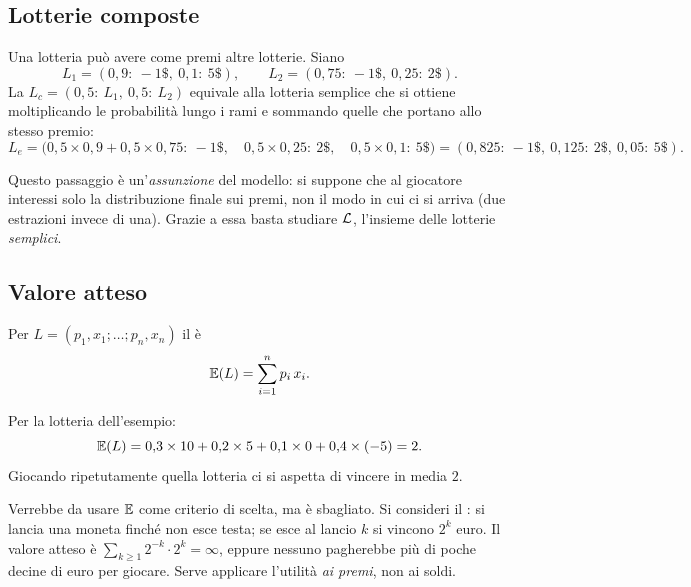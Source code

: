 \subsection{Lotterie composte}

Una lotteria può avere come premi altre lotterie. Siano
\[
  L_1 = (0{,}9{:}\ -1\$,\ 0{,}1{:}\ 5\$), \qquad
  L_2 = (0{,}75{:}\ -1\$,\ 0{,}25{:}\ 2\$).
\]
La  $L_c = (0{,}5{:}\ L_1,\ 0{,}5{:}\ L_2)$ equivale alla lotteria
semplice che si ottiene moltiplicando le probabilità lungo i rami e sommando quelle
che portano allo stesso premio:
\[
  L_e = \bigl(0{,}5 \times 0{,}9 + 0{,}5 \times 0{,}75 {:}\ -1\$,\quad
              0{,}5 \times 0{,}25 {:}\ 2\$,\quad
              0{,}5 \times 0{,}1 {:}\ 5\$\bigr)
      = (0{,}825{:}\ -1\$,\ 0{,}125{:}\ 2\$,\ 0{,}05{:}\ 5\$).
\]

\begin{osservazione}
Questo passaggio è un'\emph{assunzione} del modello: si suppone che al giocatore
interessi solo la distribuzione finale sui premi, non il modo in cui ci si arriva
(due estrazioni invece di una). Grazie a essa basta studiare $\mathcal{L}$, l'insieme delle
lotterie \emph{semplici}.
\end{osservazione}

\subsection{Valore atteso}

\begin{definizione}
Per $L = (p_1,x_1;\dots;p_n,x_n)$ il  è
\[
  \mathbb{E}(L) = \sum_{i=1}^{n} p_i\, x_i .
\]
\end{definizione}

Per la lotteria dell'esempio:
\[
  \mathbb{E}(L) = 0{,}3 \times 10 + 0{,}2 \times 5 + 0{,}1 \times 0 + 0{,}4 \times (-5) = 2 .
\]
Giocando ripetutamente quella lotteria ci si aspetta di vincere in media $2$.

\begin{attenzione}
Verrebbe da usare $\mathbb{E}$ come criterio di scelta, ma è sbagliato. Si consideri il
: si lancia una moneta finché non esce testa; se esce
al lancio $k$ si vincono $2^k$ euro. Il valore atteso è
$\sum_{k \ge 1} 2^{-k} \cdot 2^{k} = \infty$, eppure nessuno pagherebbe più di poche
decine di euro per giocare. Serve applicare l'utilità \emph{ai premi}, non ai soldi.
\end{attenzione}

